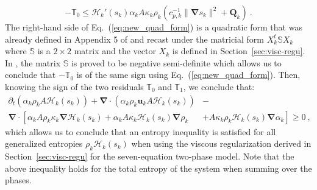 \documentclass[preprint,10pt]{elsarticle}
\renewcommand{\div}{\mbold{\nabla}\! \cdot \!}
\newcommand{\grad}{\mbold{\nabla}}
\newcommand{\mbold}[1]{\boldsymbol#1}
\newcommand{\eqt}[1]{Eq.~(\ref{#1})}                     %
\newcommand{\sct}[1]{Section~\ref{#1}}                   %
\begin{document}
\begin{appendices}
%
\begin{equation}\label{eq:new_quad_form}
- \mathbb{T}_0 \leq \mathscr{H}_k'(s_k) \alpha_k A \kappa_k \rho_k \left( c_{p,k}^{-1} \|\grad s_k\|^2 +  \mathbf{Q}_k\right) \ .
\end{equation}
%
The right-hand side of \eqt{eq:new_quad_form} is a quadratic form that was already defined in Appendix 5 of \cite{jlg} and recast under the matricial form $X^t_k \mathbb{S} X_k$ where $\mathbb{S}$ is a $2 \times 2$ matrix and the vector $X_k$ is defined in \sct{sec:visc-regu}. In \cite{jlg}, the matrix $\mathbb{S}$ is proved to be negative semi-definite which allows us to conclude that $-\mathbb{T}_0$ is of the same sign using \eqt{eq:new_quad_form}. Then, knowing the sign of the two residuals $\mathbb{T}_0$ and $\mathbb{T}_1$, we conclude that:
%
\begin{align}\label{eq:ent-res-7-eqn-diss-terms-app4}
\partial_t \left( \alpha_k \rho_k A \mathscr{H}_k(s_k)\right) + \div \left( \alpha_k \rho_k \mbold u_k A \mathscr{H}_k(s_k) \right)  &- \nonumber\\
\div \left[ \alpha_k A \rho_k \kappa_k \grad \mathscr{H}_k (s_k) + \alpha_k A \kappa_k \mathscr{H}_k (s_k) \grad \rho_k  \right. & \left. + A \kappa_k \rho_k \mathscr{H}_k (s_k) \grad \alpha_k\right] \geq 0 \ ,\nonumber 
\end{align}
%
which allows us to conclude that an entropy inequality is satisfied for all generalized entropies $\rho_k \mathscr{H}_k (s_k)$ when using the viscous regularization derived in \sct{sec:visc-regu} for the seven-equation two-phase model. Note that the above inequality holds for the total entropy of the system when summing over the phases.
\end{appendices}
\end{document}
